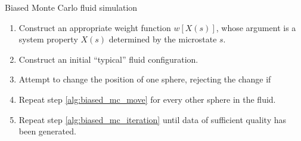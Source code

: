 \documentclass[11pt]{article}
\newcommand{\p}[1]{\left(#1\right)} %
\renewcommand{\sp}[1]{\left[#1\right]} %
\newenvironment{alg}
{\hrulefill\begin{enumerate}}
{\end{enumerate}\hrulefill}
\begin{document}
\begin{algorithm}[tb]
  \caption{Biased Monte Carlo fluid simulation}
  \label{alg:biased_MC}
  \begin{alg}

  \item Construct an appropriate weight function $w\sp{X\p{s}}$, whose
    argument is a system property $X\p{s}$ determined by the
    microstate $s$.

  \item Construct an initial ``typical'' fluid configuration.

  \item Attempt to change the position of one sphere, rejecting the
    change if
    \label{alg:biased_mc_move}

  \item Repeat step \ref{alg:biased_mc_move} for every other sphere in
    the fluid.
    \label{alg:biased_mc_iteration}

  \item Repeat step \ref{alg:biased_mc_iteration} until data of
    sufficient quality has been generated.

  \end{alg}
\end{algorithm}
\end{document}
